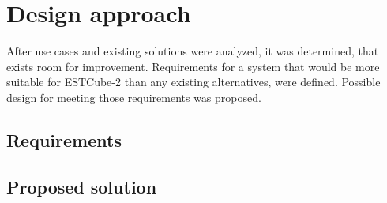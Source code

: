 \newpage
\section{Design approach}

After use cases and existing solutions were analyzed, it was determined, that exists room for improvement. Requirements for a system that would be more suitable for ESTCube-2 than any existing alternatives, were defined. Possible design for meeting those requirements was proposed.

\subsection{Requirements}



\subsection{Proposed solution}
